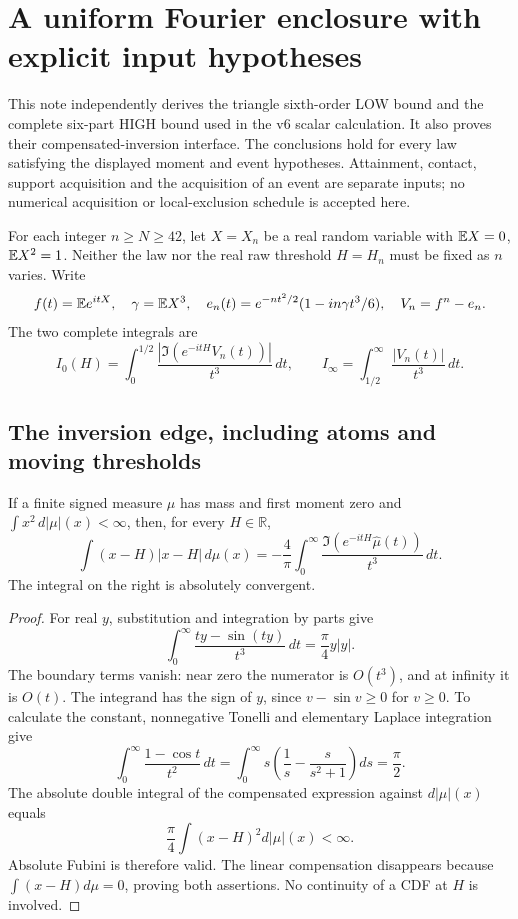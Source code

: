 \section{A uniform Fourier enclosure with explicit input hypotheses}
\label{v7fourier:section}

This note independently derives the triangle sixth-order LOW bound and the
complete six-part HIGH bound used in the v6 scalar calculation. It also
proves their compensated-inversion interface. The conclusions hold for
every law satisfying the displayed moment and event hypotheses. Attainment,
contact, support acquisition and the acquisition of an event are separate
inputs; no numerical acquisition or local-exclusion schedule is accepted here.

For each integer $n\ge N\ge42$, let $X=X_n$ be a real random variable with
$\mathbb E X=0$, $\mathbb E X^2=1$. Neither the law nor the real raw threshold $H=H_n$
must be fixed as $n$ varies. Write
\[
 f(t)=\mathbb E e^{itX},\quad \gamma=\mathbb E X^3,\quad
 e_n(t)=e^{-nt^2/2}(1-in\gamma t^3/6),\quad V_n=f^n-e_n.
\]
The two complete integrals are
\[
 I_0(H)=\int_0^{1/2}\frac{|\Im(e^{-itH}V_n(t))|}{t^3}\,dt,
 \qquad I_\infty=\int_{1/2}^\infty\frac{|V_n(t)|}{t^3}\,dt.
\]

\subsection{The inversion edge, including atoms and moving thresholds}

\begin{lemma}\label{v7fourier:inversion}
If a finite signed measure $\mu$ has mass and first moment zero and
$\int x^2\,d|\mu|(x)<\infty$, then, for every $H\in\mathbb R$,
\[
 \int(x-H)|x-H|\,d\mu(x)
 =-\frac4\pi\int_0^\infty
 \frac{\Im(e^{-itH}\widehat\mu(t))}{t^3}\,dt.
\]
The integral on the right is absolutely convergent.
\end{lemma}
\begin{proof}
For real $y$, substitution and integration by parts give
\[
 \int_0^\infty\frac{ty-\sin(ty)}{t^3}\,dt=\frac\pi4 y|y|.
\]
The boundary terms vanish: near zero the numerator is $O(t^3)$, and
at infinity it is $O(t)$. The integrand has the sign of $y$, since
$v-\sin v\ge0$ for $v\ge0$. To calculate the constant, nonnegative
Tonelli and elementary Laplace integration give
\[
 \int_0^\infty\frac{1-\cos t}{t^2}\,dt
 =\int_0^\infty s\left(\frac1s-\frac{s}{s^2+1}\right)ds
 =\frac\pi2.
\]
The absolute double integral of the compensated expression against
$d|\mu|(x)$ equals
\[
 \frac\pi4\int(x-H)^2d|\mu|(x)<\infty.
\]
Absolute Fubini is therefore valid. The linear compensation disappears
because $\int(x-H)d\mu=0$, proving both assertions. No continuity of a
CDF at $H$ is involved.
\end{proof}

